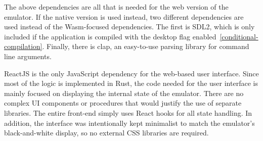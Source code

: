 The above dependencies are all that is needed for the web version of the emulator. If the native version is used instead, two different dependencies are used instead of the Wasm-focused dependencies.
The first is SDL2, which is only included if the application is compiled with the desktop flag enabled~\ref{conditional-compilation}.
Finally, there is clap, an easy-to-use parsing library for command line arguments.


ReactJS is the only JavaScript dependency for the web-based user interface.
Since most of the logic is implemented in Rust, the code needed for the user interface is mainly focused on displaying the internal state of the emulator.
There are no complex UI components or procedures that would justify the use of separate libraries.
The entire front-end simply uses React hooks for all state handling.
In addition, the interface was intentionally kept minimalist to match the emulator's black-and-white display, so no external CSS libraries are required.
